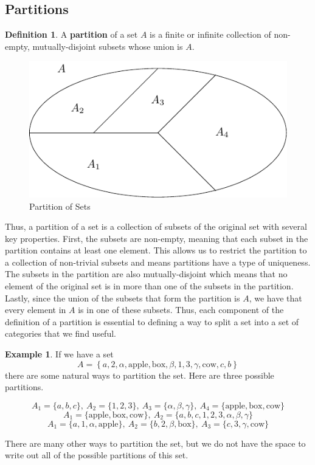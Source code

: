 \documentclass[
]{book}
\theoremstyle{definition}
\newtheorem{definition}{Definition}[chapter]
\theoremstyle{definition}
\newtheorem{example}{Example}[chapter]
\theoremstyle{definition}
\theoremstyle{definition}
\theoremstyle{remark}
\begin{document}
\hypertarget{partitions}{%
\subsection{Partitions}\label{partitions}}

\begin{definition}
\protect\hypertarget{def:partition}{}\label{def:partition}A \textbf{partition} of a set \(A\) is a finite or infinite collection of non-empty, mutually-disjoint subsets whose union is \(A\).
\end{definition}

\begin{figure}

{\centering \includegraphics[width=0.5\linewidth]{tikz/Set_partition} 

}

\caption{Partition of Sets}\label{fig:unnamed-chunk-11}
\end{figure}

Thus, a partition of a set is a collection of subsets of the original set with several key properties. First, the subsets are non-empty, meaning that each subset in the partition contains at least one element. This allows us to restrict the partition to a collection of non-trivial subsets and means partitions have a type of uniqueness. The subsets in the partition are also mutually-disjoint which means that no element of the original set is in more than one of the subsets in the partition. Lastly, since the union of the subsets that form the partition is \(A\), we have that every element in \(A\) is in one of these subsets. Thus, each component of the definition of a partition is essential to defining a way to split a set into a set of categories that we find useful.

\begin{example}
If we have a set
\[A=\left\{ a, 2, \alpha , \mbox{apple} , \mbox{box}, \beta, 1, 3, \gamma , \mbox{cow}, c, b \right\}\] there are some natural ways to partition the set. Here are three possible partitions.

\[A_1 = \{a,b,c\}, \: A_2 = \{1,2,3\},\: A_3 = \{\alpha, \beta, \gamma\}, \: A_4 = \{\mbox{apple} , \mbox{box}, \mbox{cow}\}\]
\[A_1 = \{\mbox{apple} , \mbox{box}, \mbox{cow}\}, \: A_2 = \{a,b,c,1,2,3,\alpha,\beta,\gamma\}\]
\[A_1 = \{a,1,\alpha,\mbox{apple}\}, \: A_2 = \{b,2,\beta,\mbox{box}\}, \: A_3 = \{c,3,\gamma, \mbox{cow} \}\]

There are many other ways to partition the set, but we do not have the space to write out all of the possible partitions of this set.
\end{example}
\end{document}
